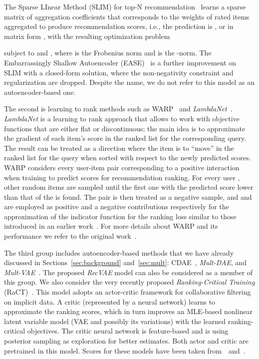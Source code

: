 \documentclass[sigconf,authorversion]{acmart}
\begin{document}
The Sparse LInear Method (SLIM) for top-N recommendation~\cite{ning2011slim} learns a sparse matrix of aggregation coefficients  that corresponds to the weights of rated items aggregated to produce recommendation scores, i.e., the prediction is , or in matrix form , with the resulting optimization problem

subject to  and , where  is the Frobenius norm and  is the -norm. The Embarrassingly Shallow Autoencoder (EASE)~\cite{steck2019embarrassingly} is a further improvement on SLIM with a closed-form solution, where the non-negativity constraint and  regularization are dropped. Despite the name, we do not refer to this model as an autoencoder-based one.

The second is learning to rank methods such as WARP~\cite{weston2011wsabie} and \emph{LambdaNet}~\cite{burges2007learning}. 
\emph{LambdaNet} is a learning to rank approach that allows to work with objective functions that are either flat or discontinuous; the main idea is to approximate the gradient of each item's score in the ranked list for the corresponding query. The result can be treated as a direction where the item is to ``move'' in the ranked list for the query when sorted with respect to the newly predicted scores. WARP considers every user-item pair  corresponding to a positive interaction when training to predict scores for recommendation ranking. For every user , other random items  are sampled until the first one with the predicted score lower than that of the  is found. The pair  is then treated as a negative sample, and  and  are employed as positive and a negative contributions respectively for the approximation of the indicator function for the ranking loss similar to those introduced in an earlier work~\cite{usunier2009ranking}. For more details about WARP and its performance we refer to the original work~\cite{weston2011wsabie}.

The third group includes autoencoder-based methods that we have already discussed in Sections~\ref{sec:background} and~\ref{sec:mult}: CDAE~\cite{wu2016collaborative}, \emph{Mult-DAE}, and \emph{Mult-VAE}~\cite{liang2018variational}. 
The proposed \emph{RecVAE} model can also be considered as a member of this group.
We also consider the very recently proposed \emph{Ranking-Critical Training} (RaCT)~\cite{lobel2019towards}. This model adopts an actor-critic framework for collaborative filtering on implicit data. A critic (represented by a neural network) learns to approximate the ranking scores, which in turn improves an MLE-based nonlinear latent variable model (VAE and possibly its variations) with the learned ranking-critical objectives. The critic neural network is feature-based and is using posterior sampling as exploration for better estimates. Both actor and critic are pretrained in this model.
Scores for these models have been taken from~\cite{liang2018variational}~and~\cite{lobel2019towards}.
\end{document}
